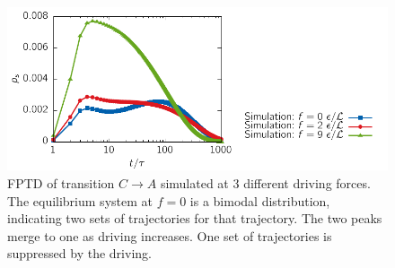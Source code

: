 \begin{figure}[t]
\centering
 \includegraphics{../plots/Urew/fpt_2010.pdf}
 \caption[First-passage time distribution of transition $C\rightarrow A$ simulated at 3 different driving forces for the 1D driven system.]{FPTD of transition $C\rightarrow A$ simulated at 3 different driving forces. The equilibrium system at $f=0$ is a bimodal distribution, indicating two sets of trajectories for that trajectory. The two peaks merge to one as driving increases. One set of trajectories is suppressed by the driving.  }
 \label{fig:fpt1D}
\end{figure}

